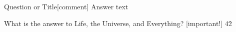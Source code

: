 \documentclass[a7paper]{kartei}
\begin{document}
\begin{karte}[Fach]{Question or Title}[comment]
	Answer text
\end{karte}

\begin{karte}
	{What is the answer to Life, the Universe, and Everything?}
	[important!]
	42
\end{karte}
\end{document}
